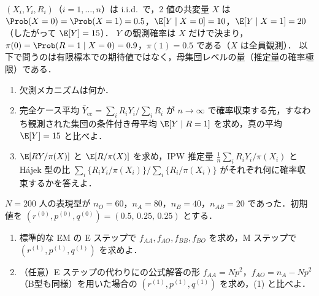 \begin{reidai}[完全ケース解析の偏り]\label{reidai:16-2}
$(X_i,Y_i,R_i)$（$i=1,\dots,n$）は i.i.d.\ で，2 値の共変量 $X$ は $\Prob(X=0)=\Prob(X=1)=0.5$，$\E[Y\mid X=0]=10$，$\E[Y\mid X=1]=20$（したがって $\E[Y]=15$）．
$Y$ の観測確率は $X$ だけで決まり，$\pi(0)=\Prob(R=1\mid X=0)=0.9$，$\pi(1)=0.5$ である（$X$ は全員観測）．
以下で問うのは有限標本での期待値ではなく，母集団レベルの量（推定量の確率極限）である．
\begin{enumerate}[label=(\arabic*)]
\item 欠測メカニズムは何か．
\item 完全ケース平均 $\bar Y_{\mathrm{cc}}=\sum_iR_iY_i/\sum_iR_i$ が $n\to\infty$ で確率収束する先，すなわち観測された集団の条件付き母平均 $\E[Y\mid R=1]$ を求め，真の平均 $\E[Y]=15$ と比べよ．
\item $\E[RY/\pi(X)]$ と $\E[R/\pi(X)]$ を求め，IPW 推定量 $\frac1n\sum_iR_iY_i/\pi(X_i)$ と Hájek 型の比 $\sum_i\{R_iY_i/\pi(X_i)\}/\sum_i\{R_i/\pi(X_i)\}$ がそれぞれ何に確率収束するかを答えよ．
\end{enumerate}
\end{reidai}

\begin{reidai}\label{reidai:16-3}
$N=200$ 人の表現型が $n_O=60$，$n_A=80$，$n_B=40$，$n_{AB}=20$ であった．初期値を $(r^{(0)},p^{(0)},q^{(0)})=(0.5,\,0.25,\,0.25)$ とする．
\begin{enumerate}[label=(\arabic*)]
\item 標準的な EM の E ステップで $f_{AA},f_{AO},f_{BB},f_{BO}$ を求め，M ステップで $(r^{(1)},p^{(1)},q^{(1)})$ を求めよ．
\item （任意）E ステップの代わりにの公式解答の形 $f_{AA}=Np^2$，$f_{AO}=n_A-Np^2$（B型も同様）を用いた場合の $(r^{(1)},p^{(1)},q^{(1)})$ を求め，(1) と比べよ．
\end{enumerate}
\end{reidai}

